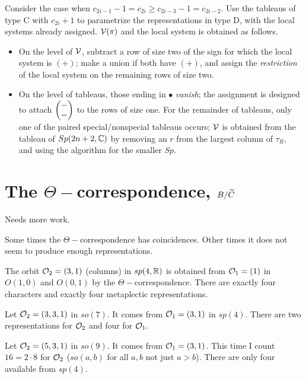 \documentclass[11pt ,reqno]{amsart}
\begin{document}
\subsubsection{} Consider the case when $c_{2i-1}-1=c_{2i}\ge
c_{2i-3}-1=c_{2i-2}.$ Use the tableaus of type C with $c_{2i}+1$ to parametrize the
representations in type D, with the local systems already assigned.
${\mathcal V}(\pi)$ and the local system is obtained as follows.

\begin{itemize}
\item On the level of ${\mathcal V}$, subtract a row of size two of the sign for
  which the local system is $(+)$; make a union if both have $(+)$,
  and assign the \textit{restriction} of the local system on the
  remaining rows of size two.
\item On the level of tableaus, those ending in $\bullet$ \textit{vanish}; the
  assignment is designed to attach $\left(\begin{matrix} -\\-\end{matrix}\right)$ to
  the rows of size one. For the remainder of tableaus, only one of the paired
  special/nonspecial tableaus occurs; ${\mathcal V}$ is obtained from the
  tableau of $Sp(2n+2,{\mathbb C})$  by removing an $r$ from the largest
  column of $\tau_R,$ and  using the algorithm for the smaller $Sp$.  
\end{itemize}




\newpage
\section{The $\Theta-$correspondence, $B/{\widetilde C}$}
{\clrr Needs more work}.

Some times the
$\Theta-$correspondence has coincidences. Other times it does not seem
to produce enough representations. 

\begin{example}
The orbit ${\mathcal O}_2=(3,1)$ (columns) in $sp(4,{\mathbb R})$ is obtained from ${\mathcal O}_1=(1)$ in $O(1,0)$ and $O(0,1)$ by the $\Theta-$correspondence. There
are exactly four characters and exactly four metaplectic representations.  
\end{example}
\begin{example}
Let ${\mathcal O}_2=(3,3,1)$ in $so(7)$. It comes from ${\mathcal O}_1=(3,1)$ in $sp(4).$ There
are two representations for ${\mathcal O}_2$ and four for ${\mathcal O}_1.$   
\end{example}
\begin{example}
Let ${\mathcal O}_2=(5,3,1)$ in $so(9).$ It comes from ${\mathcal O}_1=(3,1)$. This
time I count $16=2\cdot 8$ for ${\mathcal O}_2$ ($so(a,b)$ for all $a,b$ not
just $a>b$). There are only four available from $sp(4).$   
\end{example}
\end{document}
